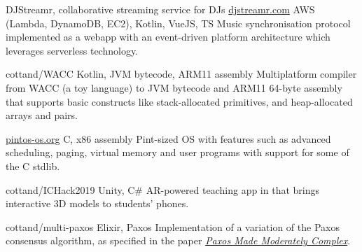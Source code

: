 \begin{entrylist}
    \projEntry
    {DJStreamr, collaborative streaming service for DJs}
    {\href{https://djstreamr.com}{djstreamr.com}}
    {AWS (Lambda, DynamoDB, EC2), Kotlin, VueJS, TS}
    {
        Music synchronisation protocol implemented as a webapp with an event-driven platform
        architecture which leverages serverless technology.
    }

    {cottand/WACC}
    {Kotlin, JVM bytecode, ARM11 assembly}
    {
        Multiplatform compiler from WACC (a toy language) to JVM bytecode and ARM11 64-byte assembly
    that supports basic constructs like stack-allocated primitives, and heap-allocated arrays
    and pairs.
    }

    {\href{https://pintos-os.org/}{pintos-os.org}}
    {C, x86 assembly}
    {
        Pint-sized OS with features such as advanced scheduling, paging, virtual memory and user
    programs with support for some of the C stdlib.
    }

    {cottand/ICHack2019}
    {Unity, C\#}
    {
        AR-powered teaching app in that brings interactive 3D models to students’ phones.
    }



    {cottand/multi-paxos}
    {Elixir, Paxos}
    {
        Implementation of a variation of the Paxos consensus algorithm, as specified in the paper
    \href{https://dl.acm.org/citation.cfm?id=2673577}{\textit{Paxos Made Moderately Complex}}.
    }
\end{entrylist}

